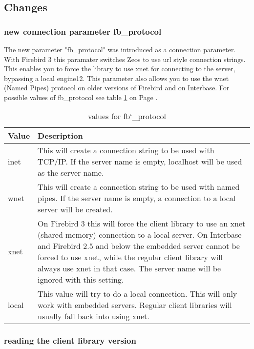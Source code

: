 \documentclass[a4paper,12pt,oneside]{book}
\begin{document}
\subsection{Changes}
\label{sec:Rev6_FirebirdInterbase_Changes}

\subsubsection{new connection parameter fb\_protocol}
\label{sec:Rev6_FirebirdInterbase_Changes_FBProtocol}

The new parameter "fb\_protocol" was introduced as a connection parameter.
With Firebird 3 this paramater switches Zeos to use url style connection strings.
This enables you to force the library to use xnet for connecting to the server, bypassing a local engine12.
This parameter also allows you to use the wnet (Named Pipes) protocol on older versions of Firebird and on Interbase.
For possible values of fb\_protocol see table \ref{tbl:Rev6_ValuesFbprotocol} on Page \pageref{tbl:Rev6_ValuesFbprotocol}.

\begin{table}
    \begin{tabular}{ p{1cm} p{13cm} }
    Value & Description \\ \hline
    inet & This will create a connection string to be used with TCP/IP. If the server name is empty, localhost will be used as the server name. \\ %
    wnet & This will create a connection string to be used with named pipes. If the server name is empty, a connection to a local server will be created. \\ %
    xnet & On Firebird 3 this will force the client library to use an xnet (shared memory) connection to a local server. On Interbase and Firebird 2.5 and below the embedded server cannot be forced to use xnet, while the regular client library will always use xnet in that case. The server name will be ignored with this setting. \\
    local & This value will try to do a local connection. This will only work with embedded servers. Regular client libraries will usually fall back into using xnet. \\
		\end{tabular}
    \caption{values for fb\char`_protocol}
    \label{tbl:Rev6_ValuesFbprotocol}
\end{table}

\subsubsection{reading the client library version}
\label{sec:Rev6_FirebirdInterbase_Changes_ReadingLibraryVersion}
\end{document}
